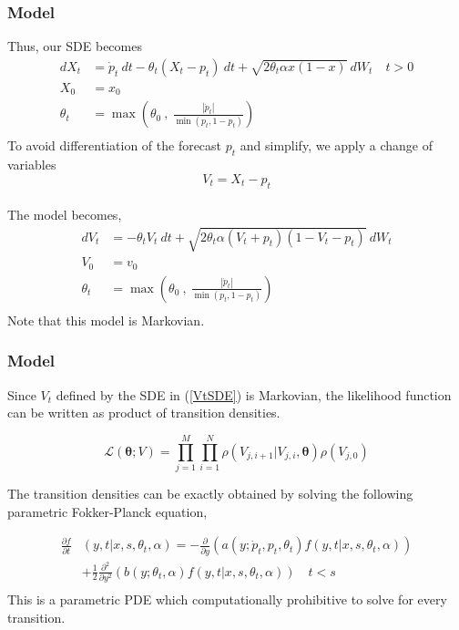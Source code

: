 \documentclass[aspectratio=169]{beamer}\usepackage[utf8]{inputenc}
\begin{document}
\begin{frame}\frametitle{Model}
Thus, our SDE becomes
\begin{equation}
\begin{split}
dX_t&= \dot{p}_t \ dt - \theta_t(X_t - p_t) \ dt + \sqrt{2 \theta_t \alpha x (1-x)}  \ dW_t \quad t > 0 \\
X_0&=x_0\\
\theta_t &= \max \left( \theta_0 \ , \ \frac{|\dot{p}_t|}{\min (p_t, 1-p_t)}  \right )\\
\end{split}
\label{model:derivative_tracking_X}
\end{equation}
To avoid differentiation of the forecast $p_t$ and simplify, we apply a change of variables $$V_t = X_t - p_t$$ \\
The  model becomes,
\begin{equation}
\begin{split}
dV_t &=  - \theta_t V_t \  dt + \sqrt{2 \theta_t \alpha (V_t +p_t ) (1-V_t-p_t)} \  dW_t  \\ %
V_0 & = v_0\\
\theta_t &= \max \left( \theta_0 \ , \ \frac{|\dot{p}_t|}{\min (p_t, 1-p_t)}  \right )\\
\end{split}\label{VtSDE}
\end{equation}
Note that this model is Markovian.
\end{frame}

\begin{frame}\frametitle{Model}
Since $V_t$ defined by the SDE in (\ref{VtSDE}) is Markovian, the likelihood function can be written as product of transition densities.

\begin{equation}
\mathcal{L}(\bm{\theta};V) =\prod\limits_{j=1}^M \prod\limits_{i=1}^N \rho ( {V_{j,i+1}|V_{j,i}}, \bm{\theta})  \rho (V_{j,0})
\label{likelihood}
\end{equation}

The transition densities can be exactly obtained by solving the following parametric Fokker-Planck equation,

\begin{equation}
\begin{split}
\frac{ \partial f }{\partial t } & (y ,t | x , s, \theta_t, \alpha )= - \frac{\partial}{ \partial y} ( a( y;\dot{p}_t , p_t, \theta_t ) f( y ,t | x , s, \theta_t , \alpha ) ) \\
& + \frac{1}{2} \frac{\partial^2}{ \partial y^2} ( b(y;\theta_t, \alpha  )  f( y ,t | x , s, \theta_t , \alpha )  ) \quad  t < s\\
\end{split}
\end{equation}
This is a parametric PDE which computationally prohibitive to solve for every transition.
\end{frame}
\end{document}
